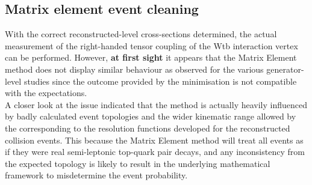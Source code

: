 %

\subsection{Matrix element event cleaning} \label{subsec::EvtCleaning}

With the correct reconstructed-level cross-sections determined, the actual measurement of the right-handed tensor coupling of the Wtb interaction vertex can be performed.
However, \textbf{at first sight} it appears that the Matrix Element method does not display similar behaviour as observed for the various generator-level studies since the outcome provided by the minimisation is not compatible with the expectations.
\\
A closer look at the issue indicated that the method is actually heavily influenced by badly calculated event topologies and the wider kinematic range allowed by the corresponding to the resolution functions developed for the reconstructed collision events.
This because the Matrix Element method will treat all events as if they were real semi-leptonic top-quark pair decays, and any inconsistency from the expected topology is likely to result in the underlying mathematical framework to misdetermine the event probability.
\\


